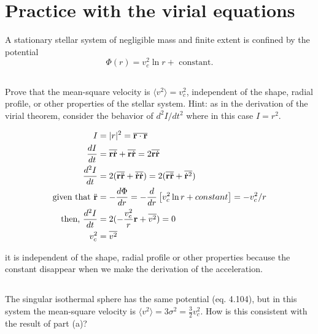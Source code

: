 \section{Practice with the virial equations}

A stationary stellar system of negligible mass and finite extent is confined by the potential  
\begin{equation}
    \Phi(r)=v_c^2\ln{r}+\text{ constant}.
\end{equation}

\subsection{}
Prove that the mean-square velocity is $\langle v^2 \rangle = v_c^2$, independent of the shape, radial profile, or other properties of the stellar system. Hint: as in the derivation of the virial theorem, consider the behavior of $d^2I/dt^2$ where in this case $I=r^2$.

\begin{align*}
    I &=|r|^2 = \overline{\mathbf{r}\cdot \mathbf{r}}\\
    \frac{dI}{dt}&= \overline{\mathbf{r}\Dot{\mathbf{r}}}+\overline{\mathbf{r}\Dot{\mathbf{r}}}=2\overline{\mathbf{r}\Dot{\mathbf{r}}}\\
    \frac{d^2I}{dt}&=2(\overline{\mathbf{r}\Ddot{\mathbf{r}}}+\overline{\Dot{\mathbf{r}}\Dot{\mathbf{r}}})=2(\overline{\mathbf{r}\Ddot{\mathbf{r}}}+\overline{\Dot{\mathbf{r}}^2})\\
    \text{given that }
    \Ddot{\mathbf{r}}&=-\frac{d\Phi}{dr}=-\frac{d}{dr}\left[v_c^2\ln{r}+constant \right]=-v_c^2/r\\
    \text{then, } \frac{d^2I}{dt}&=2(-\frac{v_c^2}{r}\mathbf{r}+\overline{v^2})=0\\
    v_c^2&=\overline{v^2}
\end{align*}

it is independent of the shape, radial profile or other properties because the constant disappear when we make the derivation of the acceleration.

\subsection{}
The singular isothermal sphere has the same potential (eq. 4.104), but in this system
the mean-square velocity is $\langle v^2\rangle = 3\sigma^2 = \frac{3}{2}v_c^2$. How is this consistent with the result of part (a)?
